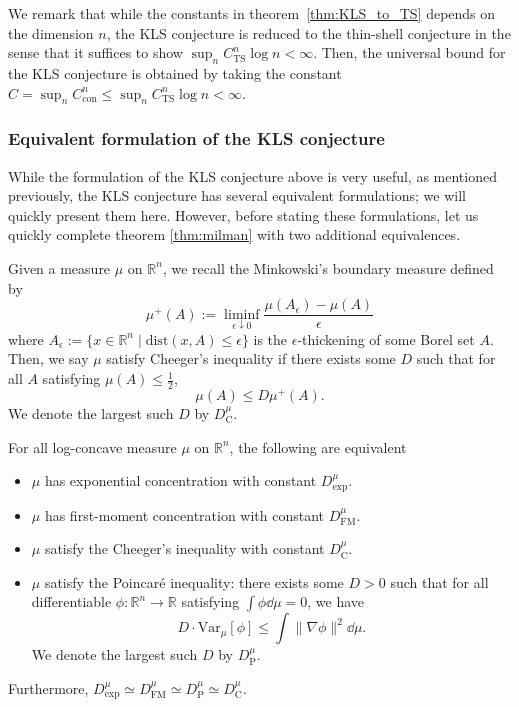 We remark that while the constants in theorem~\ref{thm:KLS_to_TS} depends on the dimension \(n\), the 
KLS conjecture is reduced to the thin-shell conjecture in the sense that it suffices to show 
\(\sup_n C^n_{\text{TS}} \log n < \infty\). Then, the universal bound for the KLS conjecture is obtained 
by taking the constant \(C = \sup_n C^n_{\text{con}} \le \sup_n C^n_{\text{TS}} \log n < \infty\).

\subsubsection{Equivalent formulation of the KLS conjecture}

While the formulation of the KLS conjecture above is very useful, as mentioned previously, the KLS 
conjecture has several equivalent formulations; we will quickly present them here. However, before 
stating these formulations, let us quickly complete theorem \ref{thm:milman} with two 
additional equivalences.

\begin{definition}
  Given a measure \(\mu\) on \(\mathbb{R}^n\), we recall the Minkowski's boundary measure 
  defined by 
  \[\mu^+(A) := \liminf_{\epsilon \downarrow 0} \frac{\mu(A_\epsilon) - \mu(A)}{\epsilon}\]
  where \(A_\epsilon := \{x \in \mathbb{R}^n \mid \text{dist}(x, A) \le \epsilon\}\) is the 
  \(\epsilon\)-thickening of some Borel set \(A\). Then, we say \(\mu\) satisfy Cheeger's inequality 
  if there exists some \(D\) such that for all \(A\) satisfying \(\mu(A) \le \frac{1}{2}\),
  \[\mu(A) \le D\mu^+(A).\]
  We denote the largest such \(D\) by \(D^\mu_{\text{C}}\).
\end{definition}

\begin{theorem}\label{thm:milman2}
  For all log-concave measure \(\mu\) on \(\mathbb{R}^n\), the following are equivalent
  \begin{itemize}
    \item \(\mu\) has exponential concentration with constant \(D^\mu_\text{exp}\).
    \item \(\mu\) has first-moment concentration with constant \(D^\mu_\text{FM}\).
    \item \(\mu\) satisfy the Cheeger's inequality with constant \(D^\mu_\text{C}\).
    \item \(\mu\) satisfy the Poincaré inequality: there exists some \(D > 0\) such that for all 
      differentiable \(\phi : \mathbb{R}^n \to \mathbb{R}\) satisfying \(\int \phi \dd\mu = 0\), we have
      \[D \cdot \text{Var}_\mu[\phi] \le \int \|\nabla \phi\|^2 \dd\mu.\]
      We denote the largest such \(D\) by \(D^\mu_{\text{P}}\).
  \end{itemize}
  Furthermore, \(D^\mu_{\text{exp}} \simeq D^\mu_{\text{FM}} \simeq D^\mu_{\text{P}} \simeq D^\mu_{\text{C}}\).
\end{theorem}

